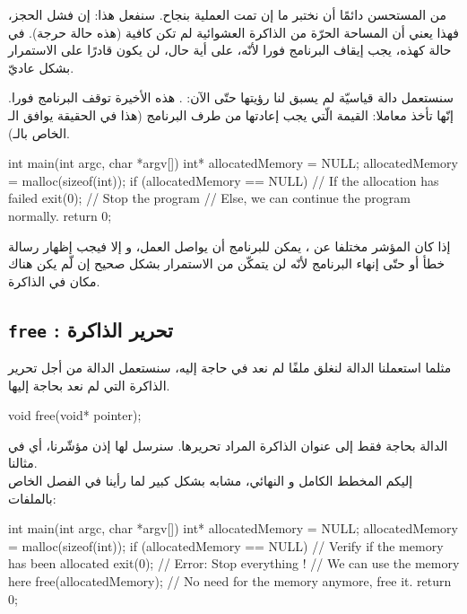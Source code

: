 من المستحسن دائمًا أن نختبر ما إن تمت العملية بنجاح. سنفعل هذا: إن فشل الحجز، فهذا يعني أن المساحة الحرّة من الذاكرة العشوائية لم تكن كافية (هذه حالة حرجة). في حالة كهذه، يجب إيقاف البرنامج فورا لأنّه، على أية حال، لن يكون قادرًا على الاستمرار بشكل عاديّ.

سنستعمل دالة قياسيّة لم يسبق لنا رؤيتها حتّى الآن:
.
هذه الأخيرة توقف البرنامج فورا. إنّها تأخذ معاملا: القيمة الّتي يجب إعادتها من طرف البرنامج (هذا في الحقيقة يوافق الـ
الخاص بالـ).

\begin{Csource}
int main(int argc, char *argv[])
{
	int* allocatedMemory = NULL;
	allocatedMemory = malloc(sizeof(int));
	if (allocatedMemory == NULL) // If the allocation has failed
	{
    	exit(0); // Stop the program
	}
	// Else, we can continue the program normally.
	return 0;
}
\end{Csource}

إذا كان المؤشر مختلفا عن
،
يمكن للبرنامج أن يواصل العمل، و إلا فيجب إظهار رسالة خطأ أو حتّى إنهاء البرنامج لأنّه لن يتمكّن من الاستمرار بشكل صحيح إن لّم يكن هناك مكان في الذاكرة.

\subsection{\texttt{free} : تحرير الذاكرة}

مثلما استعملنا الدالة
لنغلق ملفًا لم نعد في حاجة إليه، سنستعمل الدالة
من أجل تحرير الذاكرة التي لم نعد بحاجة إليها.

\begin{Csource}
void free(void* pointer);
\end{Csource}

الدالة
بحاجة فقط إلى عنوان الذاكرة المراد تحريرها. سنرسل لها إذن مؤشّرنا، أي
في مثالنا.\\
إليكم المخطط الكامل و النهائي، مشابه بشكل كبير لما رأينا في الفصل الخاص بالملفات:

\begin{Csource}
int main(int argc, char *argv[])
{
	int* allocatedMemory = NULL;
	allocatedMemory = malloc(sizeof(int));
	if (allocatedMemory == NULL) // Verify if the memory has been allocated
	{
		exit(0); // Error: Stop everything !
	}
	// We can use the memory here
	free(allocatedMemory); // No need for the memory anymore, free it.
	return 0;
}
\end{Csource}

